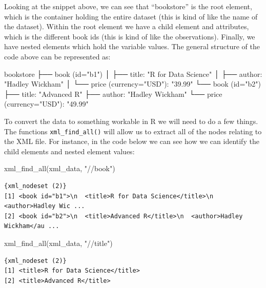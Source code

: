 \documentclass[
  letterpaper,
  DIV=11,
  numbers=noendperiod]{scrreprt}
\newenvironment{Shaded}{\begin{snugshade}}{\end{snugshade}}
\newcommand{\FunctionTok}[1]{\textcolor[rgb]{0.28,0.35,0.67}{#1}}
\newcommand{\NormalTok}[1]{\textcolor[rgb]{0.00,0.23,0.31}{#1}}
\newcommand{\StringTok}[1]{\textcolor[rgb]{0.13,0.47,0.30}{#1}}
\begin{document}
Looking at the snippet above, we can see that ``bookstore'' is the root
element, which is the container holding the entire dataset (this is kind
of like the name of the dataset). Within the root element we have a
child element and attributes, which is the different book ids (this is
kind of like the observations). Finally, we have nested elements which
hold the variable values. The general structure of the code above can be
represented as:

\begin{Shaded}
\begin{Highlighting}[]
\NormalTok{bookstore}
\NormalTok{ ├── book (id="b1")}
\NormalTok{ │     ├── title: "R for Data Science"}
\NormalTok{ │     ├── author: "Hadley Wickham"}
\NormalTok{ │     └── price (currency="USD"): "39.99"}
\NormalTok{ └── book (id="b2")}
\NormalTok{       ├── title: "Advanced R"}
\NormalTok{       ├── author: "Hadley Wickham"}
\NormalTok{       └── price (currency="USD"): "49.99"}
\end{Highlighting}
\end{Shaded}

To convert the data to something workable in R we will need to do a few
things. The functions \texttt{xml\_find\_all()} will allow us to extract
all of the nodes relating to the XML file. For instance, in the code
below we can see how we can identify the child elements and nested
element values:

\begin{Shaded}
\begin{Highlighting}[]
\FunctionTok{xml\_find\_all}\NormalTok{(xml\_data, }\StringTok{"//book"}\NormalTok{)}
\end{Highlighting}
\end{Shaded}

\begin{verbatim}
{xml_nodeset (2)}
[1] <book id="b1">\n  <title>R for Data Science</title>\n  <author>Hadley Wic ...
[2] <book id="b2">\n  <title>Advanced R</title>\n  <author>Hadley Wickham</au ...
\end{verbatim}

\begin{Shaded}
\begin{Highlighting}[]
\FunctionTok{xml\_find\_all}\NormalTok{(xml\_data, }\StringTok{"//title"}\NormalTok{)}
\end{Highlighting}
\end{Shaded}

\begin{verbatim}
{xml_nodeset (2)}
[1] <title>R for Data Science</title>
[2] <title>Advanced R</title>
\end{verbatim}
\end{document}
